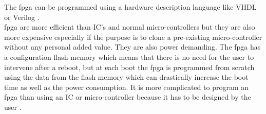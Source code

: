 The \gls{fpga} can be programmed using a hardware description language like VHDL or Verilog \citep {FPGA_youtube} \citep{FPGA_center} \citep{FPGA_toronto}. \\

\gls{fpga} are more efficient than IC's and normal micro-controllers but they are also more expensive especially if the purpose is to clone a pre-existing micro-controller without any personal added value. They are also power demanding. The \gls{fpga} has a configuration flash memory which means that there is no need for the user to intervene after a reboot, but at each boot the \gls{fpga} is programmed from scratch using the data from the flash memory which can drastically increase the boot time as well as the power consumption. It is more complicated to program an \gls{fpga} than using an IC or micro-controller because it has to be designed by the user \citep {FPGA_youtube} \citep{FPGA_center} \citep{FPGA_toronto}. \\








